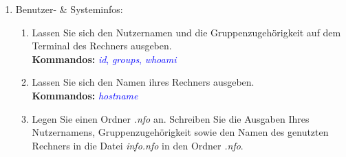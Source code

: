 \documentclass[paper=a4,fontsize=11pt]{scrartcl}%
\numberwithin{equation}{section}
\begin{document}
\begin{enumerate}
\begin{enumerate}[label=(\alph*)]
		\item Geben Sie die erste Zeile der Datei auf der Kommandozeile aus.\\
		\textbf{Kommandos:} \textcolor{blue}{\emph{head}, \emph{tail}, \emph{more}, \emph{less}}
		\item Öffnen Sie Ihr Cheat-Sheet mithilfe das Programms \emph{gedit} bzw. \emph{retext}. Notieren Sie sich alle Befehle, sowie deren Bedeutung, sodass Sie eine erste Anlaufstelle für die nächsten Übungen haben. Dieses Dokument (Sie können auch mehrere anlegen) sollten Sie fortan als Notizzettel für die Laboraufgaben nutzen!
		\item Navigieren Sie in Ihr Heimatverzeichnis. Legen Sie folgenden Ordner, sowie Unterordner mithilfe des \emph{mkdir}-Kommandos an: .
		\item Kopieren Sie die Datei bzw. den Ordner \emph{shell\_tutorial} in das eben angelegte Verzeichnis.\\
		\textbf{Kommandos:} \textcolor{blue}{\emph{cp} }
        \item Kopieren Sie die Datei(en) inklusive des Ordners  in das Verzeichnis .\\
        \textbf{Hinweise:} Schauen Sie in die Manpage von cp um herauszufinden, wie Ordner kopiert werden können.\\
        \textbf{Kommandos:} \textcolor{blue}{\emph{man cp}}
  	\end{enumerate}
  	\footnote{.md steht für Markdown, welches ein Format für Textdateien ist, ähnlich wie .pdf oder .doc-Dateien.}
        \footnote{\url{https://github.com/retext-project}}
         \footnote{Sie können auch mit vi, vim oder emacs arbeiten!}
         \item Benutzer- \& Systeminfos:
    		\begin{enumerate} [label=(\alph*)]
          \item Lassen Sie sich den Nutzernamen und die Gruppenzugehörigkeit auf dem Terminal des Rechners ausgeben.\\
          \textbf{Kommandos:} \textcolor{blue}{\emph{id}, \emph{groups}, \emph{whoami}}
          \item Lassen Sie sich den Namen ihres Rechners ausgeben.\\
          \textbf{Kommandos:} \textcolor{blue}{\emph{hostname}}
          \item Legen Sie einen Ordner \emph{.nfo} an. Schreiben Sie die Ausgaben Ihres Nutzernamens, Gruppenzugehörigkeit sowie den Namen des genutzten Rechners in die Datei \emph{info.nfo} in den Ordner \emph{.nfo}.

\end{enumerate}
\end{enumerate}
\end{document}
